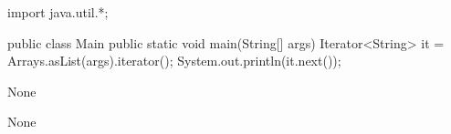 \begin{code}
import java.util.*;

public class Main {
	public static void main(String[] args) {
    Iterator<String> it = Arrays.asList(args).iterator();
    System.out.println(it.next());
	}
}\end{code}

\lstset{caption=Original Mungo output}
\begin{code}
None
\end{code}

\lstset{caption=New Mungo output}
\begin{code}
None
\end{code}

